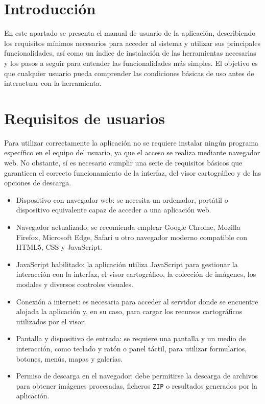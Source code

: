 
\section{Introducción}

En este apartado se presenta el manual de usuario de la aplicación, describiendo los requisitos mínimos necesarios para acceder al sistema y utilizar sus principales funcionalidades, así como un índice de instalación de las herramientas necesarias y los pasos a seguir para entender las funcionalidades más simples. El objetivo es que cualquier usuario pueda comprender las condiciones básicas de uso antes de interactuar con la herramienta.

\section{Requisitos de usuarios}

Para utilizar correctamente la aplicación no se requiere instalar ningún programa específico en el equipo del usuario, ya que el acceso se realiza mediante navegador web. No obstante, sí es necesario cumplir una serie de requisitos básicos que garanticen el correcto funcionamiento de la interfaz, del visor cartográfico y de las opciones de descarga.

\begin{itemize}
	\item Dispositivo con navegador web: se necesita un ordenador, portátil o dispositivo equivalente capaz de acceder a una aplicación web.
	
	\item Navegador actualizado: se recomienda emplear Google Chrome, Mozilla Firefox, Microsoft Edge, Safari u otro navegador moderno compatible con HTML5, CSS y JavaScript.
	
	\item JavaScript habilitado: la aplicación utiliza JavaScript para gestionar la interacción con la interfaz, el visor cartográfico, la colección de imágenes, los modales y diversos controles visuales.
	
	\item Conexión a internet: es necesaria para acceder al servidor donde se encuentre alojada la aplicación y, en su caso, para cargar los recursos cartográficos utilizados por el visor.
	
	\item Pantalla y dispositivo de entrada: se requiere una pantalla y un medio de interacción, como teclado y ratón o panel táctil, para utilizar formularios, botones, menús, mapas y galerías.
	
	\item Permiso de descarga en el navegador: debe permitirse la descarga de archivos para obtener imágenes procesadas, ficheros \texttt{ZIP} o resultados generados por la aplicación.
\end{itemize}

